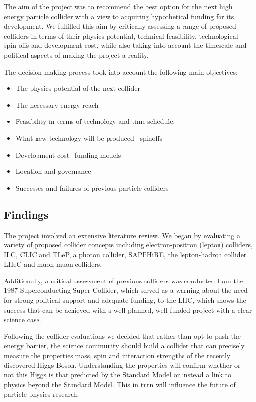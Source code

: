 The aim of the project was to recommend the best option for the next high energy particle collider with a view to acquiring hypothetical funding for its development. We fulfilled this aim by critically assessing a range of proposed colliders in terms of their physics potential, technical feasibility, technological spin-offs and development cost, while also taking into account the timescale and political aspects of making the project a reality.

The decision making process took into account the following main objectives:

\begin{itemize}
	\item The physics potential of the next collider
    \item The necessary energy reach
    \item Feasibility in terms of technology and time schedule.
    \item What new technology will be produced \textemdash \, spin\textendash offs
    \item Development cost \textemdash \, funding models
    \item Location and governance
    \item Successes and failures of previous particle colliders
\end{itemize}

\subsection{Findings}

The project involved an extensive literature review. We began by evaluating a variety of proposed collider concepts including electron-positron (lepton) colliders, ILC, CLIC and TLeP, a photon collider, SAPPHiRE, the lepton-hadron collider LHeC and muon-muon colliders.

Additionally, a critical assessment of previous colliders was conducted from the 1987 Superconducting Super Collider, which served as a warning about the need for strong political support and adequate funding, to the LHC, which shows the success that can be achieved with a well-planned, well-funded project with a clear science case.

Following the collider evaluations we decided that rather than opt to push the energy barrier, the science community should build a collider that can precisely measure the properties \textendash mass, spin and interaction strengths \textendash of the recently discovered Higgs Boson. Understanding the properties will confirm whether or not this Higgs is that predicted by the Standard Model or instead a link to physics beyond the Standard Model. This in turn will influence the future of particle physics research.


